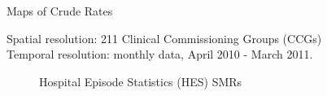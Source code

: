 \documentclass[slidestop,compress,serif,10pt]{beamer}
\begin{document}
\begin{frame}{Maps of Crude Rates}

 \begin{block}{}
\small{Spatial resolution: 211 Clinical Commissioning Groups (CCGs)\\
Temporal resolution: monthly data, April 2010 - March 2011.\\
}
\end{block}
\centering
\begin{figure}\caption{Hospital Episode Statistics (HES) SMRs}
\end{figure}
\end{frame}
\end{document}
